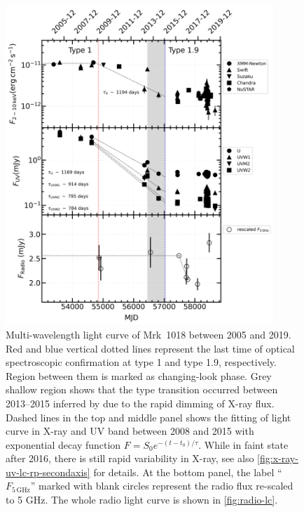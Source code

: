 \documentclass[twocolumn]{aastex63}
\begin{document}
\begin{figure}
\centering
	\includegraphics[width=0.9\textwidth]{./pic/subplots-xrt_uvot-radio-second.png}
    \caption{Multi-wavelength light curve of Mrk~1018 between 2005 and 2019. Red and blue vertical dotted lines represent the last time of optical spectroscopic confirmation at type 1 and type 1.9, respectively. Region between them is marked as changing-look phase. Grey shallow region shows that the type transition occurred between 2013--2015 inferred by \citet{2017A&A...607L...9K} due to the rapid dimming of X-ray flux. Dashed lines in the top and middle panel shows the fitting of light curve in X-ray and UV band between 2008 and 2015 with exponential decay function $F=S_0 e^{-(t-t_0)/\tau }$.  While in faint state after 2016, there is still rapid variability in X-ray, see also \autoref{fig:x-ray-uv-lc-rp-secondaxis} for details. At the bottom panel, the label ``$F_\mathrm{5\,GHz}$'' marked with blank circles represent the radio flux re-scaled to 5 GHz. The whole radio light curve is shown in \autoref{fig:radio-lc}.}
    \label{fig:multi-lc-secondaxis}
\end{figure}
\end{document}
